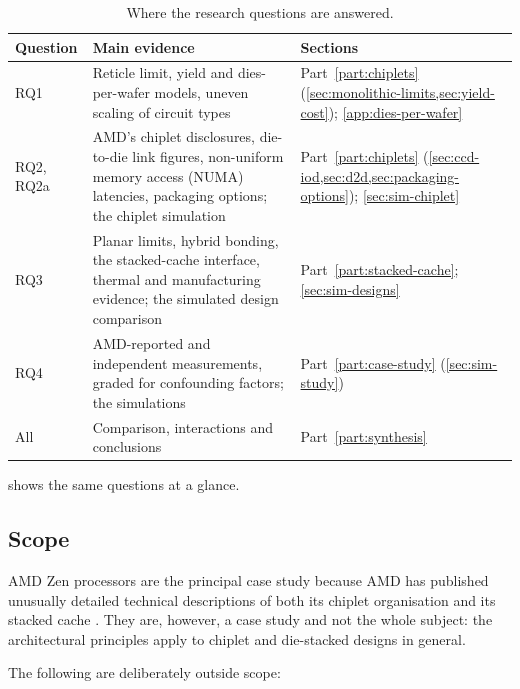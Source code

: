 \begin{table}[htbp]
  \centering
  \caption[Where the research questions are answered]{Where the research questions are answered.}
  \label{tab:rq-map}
  \small
  \begin{tabularx}{\textwidth}{@{}lX>{\raggedright\arraybackslash}p{4.2cm}@{}}
    \toprule
    \textbf{Question} & \textbf{Main evidence} & \textbf{Sections} \\
    \midrule
    RQ1 & Reticle limit, yield and dies-per-wafer models, uneven scaling of circuit types & Part~\ref{part:chiplets} (\cref{sec:monolithic-limits,sec:yield-cost}); \cref{app:dies-per-wafer} \\
    RQ2, RQ2a & AMD's chiplet disclosures, die-to-die link figures, non-uniform memory access (NUMA) latencies, packaging options; the chiplet simulation & Part~\ref{part:chiplets} (\cref{sec:ccd-iod,sec:d2d,sec:packaging-options}); \cref{sec:sim-chiplet} \\
    RQ3 & Planar limits, hybrid bonding, the stacked-cache interface, thermal and manufacturing evidence; the simulated design comparison & Part~\ref{part:stacked-cache}; \cref{sec:sim-designs} \\
    RQ4 & AMD-reported and independent measurements, graded for confounding factors; the simulations & Part~\ref{part:case-study} (\cref{sec:sim-study}) \\
    All & Comparison, interactions and conclusions & Part~\ref{part:synthesis} \\
    \bottomrule
  \end{tabularx}
\end{table}

 shows the same questions at a glance.




\subsection{Scope}
\label{sec:scope}

AMD Zen processors are the principal case study because AMD has published unusually detailed technical descriptions of both its chiplet organisation and its stacked cache \cite{naffziger2020chiplet,suggs2019zen2,amd2022epyc7003,swaminathanAdvancedPackagingEnabling2021}. They are, however, a case study and not the whole subject: the architectural principles apply to chiplet and die-stacked designs in general.

The following are deliberately outside scope:

